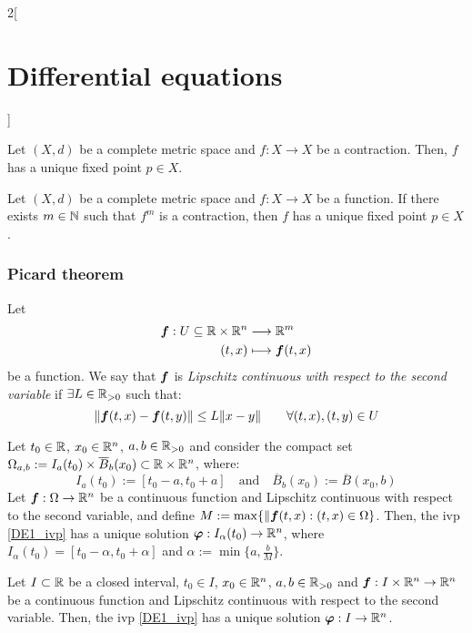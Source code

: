 \documentclass[../../../main.tex]{subfiles}
\begin{document}
\begin{multicols}{2}[\section{Differential equations}]
\begin{prop}
  \end{prop}
  \begin{theorem}
    Let $(X,d)$ be a complete metric space and $f:X\rightarrow X$ be a contraction. Then, $f$ has a unique fixed point $p\in X$.
  \end{theorem}
  \begin{corollary}
    Let $(X,d)$ be a complete metric space and $f:X\rightarrow X$ be a function. If there exists $m\in\mathbb{N}$ such that $f^m$ is a contraction, then $f$ has a unique fixed point $p\in X$.
  \end{corollary}
  \subsubsection*{Picard theorem}
  \begin{definition}
    Let
    \begin{align*}
      \boldsymbol{f}:U\subseteq\mathbb{R}\times\mathbb{R}^n & \longrightarrow\mathbb{R}^m               \\
      (t,x)                                       & \longmapsto\boldsymbol{f}(t,x)
    \end{align*}
    be a function. We say that $\boldsymbol{f}$ is \textit{Lipschitz continuous with respect to the second variable} if $\exists L\in\mathbb{R}_{>0}$ such that: $$\|\boldsymbol{f}(t,x)-\boldsymbol{f}(t,y)\|\leq L\|x-y\|\qquad\forall (t,x),(t,y)\in U$$
  \end{definition}
  \begin{theorem}
    Let $t_0\in\mathbb{R}$, $x_0\in\mathbb{R}^n$, $a,b\in\mathbb{R}_{>0}$ and consider the compact set $\Omega_{a,b}:=I_a(t_0)\times\overline{B}_{b}(x_0)\subset\mathbb{R}\times\mathbb{R}^n$, where: $$I_a(t_0):=[t_0-a,t_0+a]\quad\text{and}\quad\overline{B}_{b}(x_0):=\overline{B}(x_0,b)$$
    Let $\boldsymbol{f}:\Omega\rightarrow\mathbb{R}^n$ be a continuous function and Lipschitz continuous with respect to the second variable, and define $M:=\max\{\|\boldsymbol{f}(t,x):(t,x)\in\Omega\}$. Then, the ivp \ref{DE1_ivp} has a unique solution $\boldsymbol{\varphi}:I_\alpha(t_0)\rightarrow\mathbb{R}^n$, where $I_\alpha(t_0)=[t_0-\alpha,t_0+\alpha]$ and $\alpha:=\min\{a,\frac{b}{M}\}$.
  \end{theorem}
  \begin{prop}
    Let $I\subset \mathbb{R}$ be a closed interval, $t_0\in I$, $x_0\in\mathbb{R}^n$, $a,b\in\mathbb{R}_{>0}$ and $\boldsymbol{f}:I\times\mathbb{R}^n\rightarrow\mathbb{R}^n$ be a continuous function and Lipschitz continuous with respect to the second variable. Then, the ivp \ref{DE1_ivp} has a unique solution $\boldsymbol{\varphi}:I\rightarrow\mathbb{R}^n$.

\end{prop}
\end{multicols}
\end{document}
